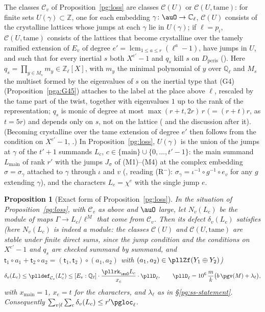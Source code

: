 \documentclass[10pt]{amsart}
\newtheorem{proposition}[theorem]{Proposition}
\theoremstyle{definition}
\theoremstyle{remark}
\newcommand{\C}{\mathbb C}
\newcommand{\Z}{\mathbb Z}
\newcommand{\Q}{\mathbb Q}
\begin{document}
The classes $\mathcal C_v$ of Proposition~\ref{pg:loss} are classes $\mathcal C(U)$ or
$\mathcal C(U,\mathrm{tame})$: for finite sets $U(\gamma)\subset\Z$, one for each embedding
$\gamma\colon\auO\to\C_\ell$, $\mathcal C(U)$ consists of the crystalline lattices whose jumps at
each $\gamma$ lie in $U(\gamma)$; if $\ell=p_i$, $\mathcal C(U,\mathrm{tame})$ consists of the
lattices that become crystalline over the tamely ramified extension of $E_v$ of degree
$e'=\operatorname{lcm}_{1\le a\le r}(\ell^a-1)$, have jumps in $U$, and such that for every inertial
$s$ both $X^{e'}-1$ and $q_s$ kill $s$ on $D_{\mathrm{pcris}}$ ({\cite[Definition~9.2]{P56}}). Here
$q_s=\prod_{y\in M_s}m_y\in\Z_\ell[X]$, with $m_y$ the minimal polynomial of $y$ over $\Q_\ell$ and
$M_s$ the multiset formed by the eigenvalues of $s$ on the inertial type that (G4)
(Proposition~\ref{pga:G45}) attaches to the label at the place above $\ell$, rescaled by the tame part
of the twist, together with eigenvalues $1$ up to the rank of the representation; $q_s$ is monic of degree at most
$\max(r+t,2r)\,r$ $(=(r+t)r$, as $t=5r)$ and depends only on $s$, not on the lattice
({\cite[Proposition~9.23]{P56}} and the discussion after it). (Becoming crystalline over the tame extension of
degree $e'$ then follows from the condition on $X^{e'}-1$, {\cite[Theorem~9.9]{P56}}.) In Proposition~\ref{pg:loss}, $U(\gamma)$ is the union of the
jumps at $\gamma$ of the $t'+1$ summands $L_c$, $c\in\{\mathrm{main}\}\cup\{0,\dots,t'-1\}$: the
main summand $L_{\mathrm{main}}$ of rank $r'$ with the jumps $J_\sigma$ of (M1)--(M4) at the complex
embedding $\sigma=\sigma_\gamma$ attached to $\gamma$ through $\iota$ and $v$ ({\cite[Convention~7.1]{P56}},
reading (R$^-$): $\sigma_\gamma=\iota^{-1}\circ g^{-1}\circ e_v$ for any $g$ extending $\gamma$), and the characters $L_e=\chi^e$ with the single jump $e$.

\begin{proposition}[Exact form of Proposition~\ref{pg:loss}]\label{pll:main}
In the situation of Proposition~\ref{pg:loss}, with $\mathcal C_v$ as above and $\auO$ large, let
$N_v(L_c)$ be the module of maps $\Gamma\to L_c/\ell^M$ that come from $\mathcal C_v$. Then its
defect $\delta_v(L_c)$ satisfies (here $N_v(L_c)$ is indeed a module: the classes
$\mathcal C(U)$ and $\mathcal C(U,\mathrm{tame})$ are stable under finite direct sums, since the
jump condition and the conditions on $X^{e'}-1$ and $q_s$ are checked summand by summand, and
$\mathsf t_1\circ a_1+\mathsf t_2\circ a_2=(\mathsf t_1,\mathsf t_2)\circ(a_1,a_2)$ with
$(a_1,a_2)\in\pllZf(Y_1\oplus Y_2)$)
\begin{equation}\label{pll:eq-place}
\delta_v(L_c)\le\plldef_{\mathcal C_v}(L_c^*)\le[E_v:\Q_\ell]\cdot\frac{\pllrk_\auO L_c}{x_c}
\cdot\pllD_\ell,\qquad
\pllD_\ell=10^6\,\frac mk\bigl(b\,\pgv(M)+\lambda_\ell\bigr),
\end{equation}
with $x_{\mathrm{main}}=1$, $x_e=t$ for the characters, and $\lambda_\ell$ as in
\S\ref{pg:ss-statement}. Consequently $\sum_{v\mid\ell}\sum_c\delta_v(L_c)\le r'\pgloc_\ell$.
\end{proposition}
\end{document}
